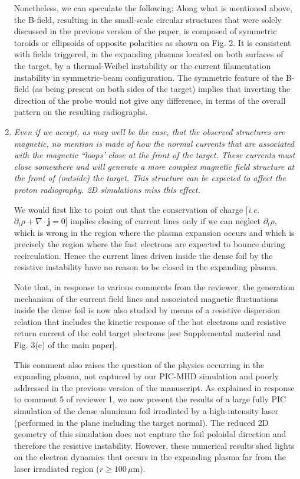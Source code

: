 \documentclass[aps,showpacs,superscriptaddress]{revtex4}%
\begin{document}
\begin{enumerate}
Nonetheless, we can speculate the following: Along what is mentioned above, the B-field, resulting in the small-scale circular structures that were solely discussed in the previous version of the paper, is composed of symmetric toroids or ellipsoids of opposite polarities as shown on Fig. 2. 
It is consistent with fields triggered, in the expanding plasmas located on both surfaces of the target, by a thermal-Weibel instability or the current filamentation instability in symmetric-beam configuration. 
The symmetric feature of the B-field (as being present on both sides of the target) implies that inverting the direction of the probe would not give any difference, in terms of the overall pattern on the resulting radiographs.

\item \textit{Even if we accept, as may well be the case, that the observed structures are magnetic, no mention is made of how the normal currents that are associated with the magnetic ``loops' close at the front of the target. These currents must close somewhere and will generate a more complex magnetic field structure at the front of (outside) the target. This structure can be expected to affect the proton radiography. 2D simulations miss this effect.}

We would first like to point out that the conservation of charge [\emph{i.e.} $\partial_t \rho+\nabla \cdot \mathbf{j}=0$] implies closing of current lines only if we can neglect $\partial_t \rho$, which is  wrong in the region  where the plasma expansion occurs and which is precisely  the region where the fast electrons are expected to bounce during recirculation.
Hence  the current lines  driven inside the dense foil by the resistive instability have no reason to be closed in the expanding plasma.


Note that, in response to various comments from the reviewer,  the generation mechanism of the current field lines and associated magnetic fluctuations inside the dense foil is now also studied by means of a resistive dispersion relation that includes the kinetic response of the hot electrons and resistive return current of the cold target electrons [see Supplemental material and Fig. 3(e) of the main paper]. 

This comment also raises the question of the physics occurring in the expanding plasma,  not captured by our PIC-MHD simulation and poorly addressed in the previous version of the manuscript.
As explained in response to comment 5 of reviewer 1, 
we now present the results of a large fully PIC simulation of the dense aluminum foil irradiated by a high-intensity laser (performed in the plane including the target normal). 
The reduced 2D geometry of this simulation does not  capture the foil poloidal direction and therefore the resistive instability. 
However, these numerical results shed lights on the electron dynamics that occurs in the expanding plasma far from the laser irradiated region ($r \ge 100 \, \mu$m).


\end{enumerate}
\end{document}
